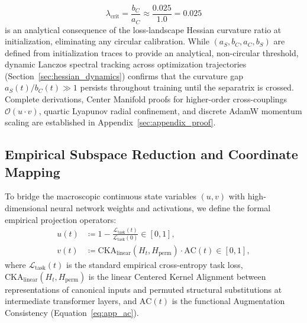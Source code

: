 \documentclass{article}
\theoremstyle{plain}
\theoremstyle{definition}
\begin{document}
\begin{equation}
    \lambda_{\text{crit}} = \frac{b_C}{a_C} \approx \frac{0.025}{1.0} = 0.025
    \label{eq:lambda_crit_analytical}
\end{equation}
is an analytical consequence of the loss-landscape Hessian curvature ratio at initialization, eliminating any circular calibration. While $(a_S, b_C, a_C, b_S)$ are defined from initialization traces to provide an analytical, non-circular threshold, dynamic Lanczos spectral tracking across optimization trajectories (Section~\ref{sec:hessian_dynamics}) confirms that the curvature gap $a_S(t) / b_C(t) \gg 1$ persists throughout training until the separatrix is crossed. Complete derivations, Center Manifold proofs for higher-order cross-couplings $\mathcal{O}(u \cdot v)$, quartic Lyapunov radial confinement, and discrete AdamW momentum scaling are established in Appendix~\ref{sec:appendix_proof}.
\subsection{Empirical Subspace Reduction and Coordinate Mapping}
\label{sec:subspace_reduction}
To bridge the macroscopic continuous state variables $(u, v)$ with high-dimensional neural network weights and activations, we define the formal empirical projection operators:
\begin{align}
    u(t) &\coloneqq 1 - \frac{\mathcal{L}_{\text{task}}(t)}{\mathcal{L}_{\text{task}}(0)} \in [0, 1], \label{eq:u_mapping} \\
    v(t) &\coloneqq \text{CKA}_{\text{linear}}(H_t, H_{\text{perm}}) \cdot \text{AC}(t) \in [0, 1], \label{eq:v_mapping}
\end{align}
where $\mathcal{L}_{\text{task}}(t)$ is the standard empirical cross-entropy task loss, $\text{CKA}_{\text{linear}}(H_t, H_{\text{perm}})$ is the linear Centered Kernel Alignment between representations of canonical inputs and permuted structural substitutions at intermediate transformer layers, and $\text{AC}(t)$ is the functional Augmentation Consistency (Equation~\eqref{eq:app_ac}).
\end{document}
